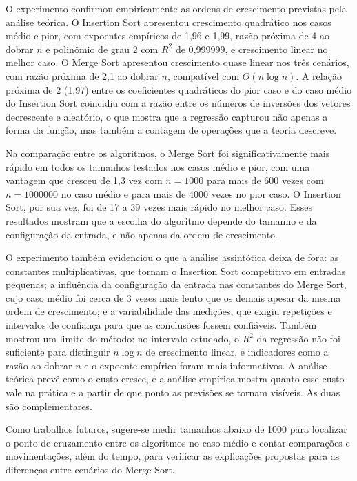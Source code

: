 \documentclass[
    12pt,
    oneside,
    a4paper,
    openany,
    chapter=TITLE,
    english,
    brazil
]{abntex2}
\begin{document}
O experimento confirmou empiricamente as ordens de crescimento previstas pela análise teórica. O Insertion Sort apresentou crescimento quadrático nos casos médio e pior, com expoentes empíricos de 1,96 e 1,99, razão próxima de 4 ao dobrar $n$ e polinômio de grau 2 com $R^2$ de 0,999999, e crescimento linear no melhor caso. O Merge Sort apresentou crescimento quase linear nos três cenários, com razão próxima de 2,1 ao dobrar $n$, compatível com $\Theta(n \log n)$. A relação próxima de 2 (1,97) entre os coeficientes quadráticos do pior caso e do caso médio do Insertion Sort coincidiu com a razão entre os números de inversões dos vetores decrescente e aleatório, o que mostra que a regressão capturou não apenas a forma da função, mas também a contagem de operações que a teoria descreve.

Na comparação entre os algoritmos, o Merge Sort foi significativamente mais rápido em todos os tamanhos testados nos casos médio e pior, com uma vantagem que cresceu de 1,3 vez com $n = \num{1000}$ para mais de 600 vezes com $n = \num{1000000}$ no caso médio e para mais de \num{4000} vezes no pior caso. O Insertion Sort, por sua vez, foi de 17 a 39 vezes mais rápido no melhor caso. Esses resultados mostram que a escolha do algoritmo depende do tamanho e da configuração da entrada, e não apenas da ordem de crescimento.

O experimento também evidenciou o que a análise assintótica deixa de fora: as constantes multiplicativas, que tornam o Insertion Sort competitivo em entradas pequenas; a influência da configuração da entrada nas constantes do Merge Sort, cujo caso médio foi cerca de 3 vezes mais lento que os demais apesar da mesma ordem de crescimento; e a variabilidade das medições, que exigiu repetições e intervalos de confiança para que as conclusões fossem confiáveis. Também mostrou um limite do método: no intervalo estudado, o $R^2$ da regressão não foi suficiente para distinguir $n \log n$ de crescimento linear, e indicadores como a razão ao dobrar $n$ e o expoente empírico foram mais informativos. A análise teórica prevê como o custo cresce, e a análise empírica mostra quanto esse custo vale na prática e a partir de que ponto as previsões se tornam visíveis. As duas são complementares.

Como trabalhos futuros, sugere-se medir tamanhos abaixo de \num{1000} para localizar o ponto de cruzamento entre os algoritmos no caso médio e contar comparações e movimentações, além do tempo, para verificar as explicações propostas para as diferenças entre cenários do Merge Sort.
\end{document}
